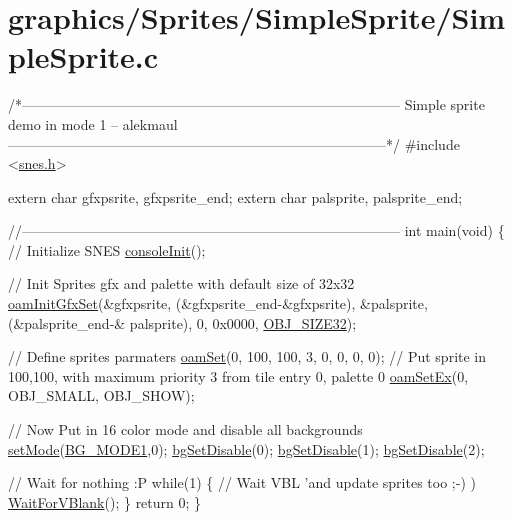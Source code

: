 \hypertarget{a00473}{}\section{graphics/\+Sprites/\+Simple\+Sprite/\+Simple\+Sprite.\+c}

\begin{DoxyCodeInclude}
\textcolor{comment}{/*---------------------------------------------------------------------------------}
\textcolor{comment}{}
\textcolor{comment}{}
\textcolor{comment}{    Simple sprite demo in mode 1}
\textcolor{comment}{    -- alekmaul}
\textcolor{comment}{}
\textcolor{comment}{}
\textcolor{comment}{---------------------------------------------------------------------------------*/}
\textcolor{preprocessor}{#include <\hyperlink{a00419}{snes.h}>}

\textcolor{keyword}{extern} \textcolor{keywordtype}{char} gfxpsrite, gfxpsrite\_end;
\textcolor{keyword}{extern} \textcolor{keywordtype}{char} palsprite, palsprite\_end;

\textcolor{comment}{//---------------------------------------------------------------------------------}
\textcolor{keywordtype}{int} main(\textcolor{keywordtype}{void}) \{
    \textcolor{comment}{// Initialize SNES }
    \hyperlink{a00383_a6047713bb5a73afd3cd1d77e336bcdad}{consoleInit}();
    
    \textcolor{comment}{// Init Sprites gfx and palette with default size of 32x32}
    \hyperlink{a00413_a46e0be47f8fc865a7f43c1b0b126e59a}{oamInitGfxSet}(&gfxpsrite, (&gfxpsrite\_end-&gfxpsrite), &palsprite, (&palsprite\_end-&
      palsprite), 0, 0x0000, \hyperlink{a00413_abc6679a83d9647eac01c3d51ef37151a}{OBJ\_SIZE32});

    \textcolor{comment}{// Define sprites parmaters}
    \hyperlink{a00413_a2f62a591672b786d90ebb03fdf25f159}{oamSet}(0,  100, 100, 3, 0, 0, 0, 0); \textcolor{comment}{// Put sprite in 100,100, with maximum priority 3 from tile
       entry 0, palette 0}
    \hyperlink{a00413_a4120a8ff32c39973babeca3615a0a2fd}{oamSetEx}(0, OBJ\_SMALL, OBJ\_SHOW);
    
    \textcolor{comment}{// Now Put in 16 color mode and disable all backgrounds}
    \hyperlink{a00416_afd9e46ae627d055dd8c98a4b0ebb73b1}{setMode}(\hyperlink{a00380_a05c862edb7f8f75036f10c04dcc3c2a6}{BG\_MODE1},0); \hyperlink{a00380_a4dbfb1b8854ff9ca4a7d11a899281bbb}{bgSetDisable}(0); 
      \hyperlink{a00380_a4dbfb1b8854ff9ca4a7d11a899281bbb}{bgSetDisable}(1); \hyperlink{a00380_a4dbfb1b8854ff9ca4a7d11a899281bbb}{bgSetDisable}(2);
    
    \textcolor{comment}{// Wait for nothing :P}
    \textcolor{keywordflow}{while}(1) \{
        \textcolor{comment}{// Wait VBL 'and update sprites too ;-) )}
        \hyperlink{a00389_a815e2626bd26d0e936d507a363ecd723}{WaitForVBlank}();
    \}
    \textcolor{keywordflow}{return} 0;
\}
\end{DoxyCodeInclude}
 